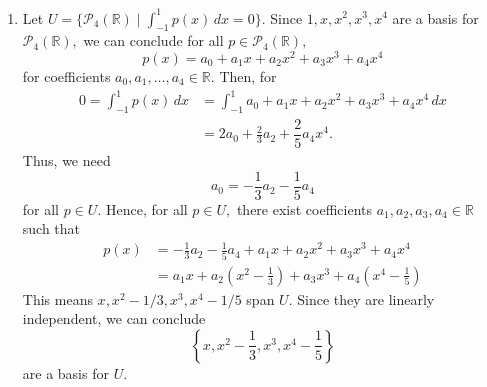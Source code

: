 \documentclass[12pt]{article}
\begin{document}
\begin{enumerate}
\begin{itemize}
      \item If $\dim = 3,$ then there is a basis $\{\vec b_1, \vec
        b_2, \vec b_3\}$ such that for all $u \in U,$ there are $\mu,
        \lambda, \nu$ such that $$
        u = \lambda \vec b_1 + \mu \vec b_2 + \nu \vec b_3.
        $$
        Since $\vec b_1, \vec b_2, \vec b_3$ are three linearly
        independent vectors in $\mathbb R^3,$ the matrix
        $$
        \begin{pmatrix}
          \vec b_1 & \vec b_2  & \vec b_3
        \end{pmatrix}
        $$
        has rank $3,$ meaning it is invertible, and there exist
        coefficients $\lambda, \mu, \nu$ for all $v \in \mathbb R^3$
        such that $\lambda \vec b_1 + \mu \vec b_2 + \nu \vec b_3 =v
        .$ In other words, this basis spans $\mathbb R^3,$ and hence
        $U = \mathbb R^3.$
    \end{itemize}

  \item Let $U = \{\mathcal P_4(\mathbb R) \mid \int_{-1}^{1} p(x) \,
    dx = 0\}.$ Since $1, x, x^2, x^3, x^4$ are a basis for $\mathcal
    P_4(\mathbb  R),$ we can conclude for all $p \in \mathcal P_4(\mathbb R),$
    $$
    p(x) = a_0 + a_1 x + a_2 x^2 + a_3 x^3 + a_4 x^4
    $$
    for coefficients $a_0, a_1, \ldots, a_4 \in \mathbb R.$ Then, for
    \begin{align*}
      0 = \int_{-1}^{1} p(x) \, dx &= \int_{-1}^{1} a_0 + a_1 x + a_2
      x^2 + a_3 x^3 + a_4 x^4 \, dx \\
      &=  2a_0 + \frac{2}{3}a_2 + \dfrac{2}{5} a_4 x^4.
    \end{align*}
    Thus, we need
    $$
    a_0 = - \frac{1}{3}a_2 - \frac{1}{5} a_4
    $$
    for all $p \in U.$ Hence, for all $p \in U,$ there exist
    coefficients $a_1, a_2, a_3, a_4 \in \mathbb R$ such that
    \begin{align*}
      p(x) &= -\frac{1}{3} a_2 - \frac{1}{5} a_4 + a_1 x + a_2 x^2 +
      a_3 x^3 + a_4 x^4 \\
      &= a_1 x + a_2 \left(x^2 - \frac{1}{3}\right) +
      a_3 x^3 +
      a_4\left(x^4 - \frac{1}{5}\right)
    \end{align*}
    This means $x, x^2 - 1/3, x^3, x^4 - 1/5$ span $U.$ Since they
    are linearly independent, we can conclude
    $$
    \left\{
      x, x^2 - \frac{1}3{}, x^3, x^4 - \frac{1}{5}
    \right\}
    $$
    are a basis for $U.$


\end{enumerate}
\end{document}
